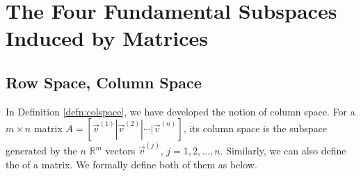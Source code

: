 
\section{The Four Fundamental Subspaces Induced by Matrices}

\subsection{Row Space, Column Space}

In Definition \ref{defn:colspace}, we have developed the notion of column space. For a $m\times n$ matrix $A = [\vec{v}^{(1)}|\vec{v}^{(2)}|\cdots|\vec{v}^{(n)}]$, its column space is the subspace generated by the $n$ $\mathbb{R}^m$ vectors $\vec{v}^{(j)}$, $j = 1,2,\ldots,n$. Similarly, we can also define the  of a matrix. We formally define both of them as below.

